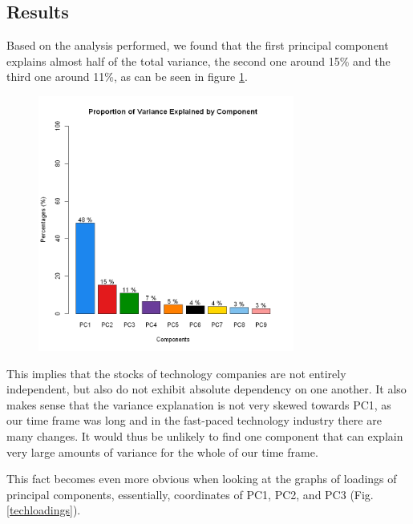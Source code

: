 \documentclass{article}
\begin{document}
\subsection{Results}
Based on the analysis performed, we found that the first principal component explains almost half of the total variance, the second one around 15\% and the third one around 11\%, as can be seen in figure \ref{techvar_exp}.  

 
\begin{figure}[H]
\centering
\caption{}
\includegraphics[width=0.75\textwidth]{allvar_exp.png}
\label{techvar_exp}
\end{figure}
This implies that the stocks of technology companies are not entirely independent, but also do not exhibit absolute dependency on one another. It also makes sense that the variance explanation is not very skewed towards PC1, as our time frame was long and in the fast-paced technology industry there are many changes. It would thus be unlikely to find one component that can explain very large amounts of variance for the whole of our time frame. 

This fact becomes even more obvious when looking at the graphs of loadings of principal components, essentially, coordinates of PC1, PC2, and PC3 (Fig. \ref{techloadings}).
\end{document}

